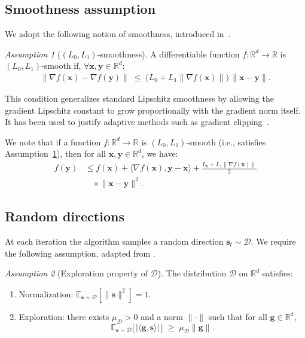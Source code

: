 \documentclass[twoside]{article}
\theoremstyle{plain}
\theoremstyle{definition}
\theoremstyle{remark}
\newtheorem{assumption}{Assumption}
\def\vg{{\bm{g}}}
\def\vs{{\bm{s}}}
\def\vx{{\bm{x}}}
\def\vy{{\bm{y}}}
\newcommand{\E}{\mathbb{E}}
\begin{document}
\subsection{Smoothness assumption}

We adopt the following notion of smoothness, introduced in~\cite{zhang2020gradientclippingacceleratestraining}.

\begin{assumption}[$(L_0,L_1)$-smoothness]
\label{ass:smoothness}
A differentiable function $f:\mathbb{R}^d \to \mathbb{R}$ is $(L_0,L_1)$-smooth if, $\forall \vx,\vy \in \mathbb{R}^d:$
\begin{multline}
    \|\nabla f(\vx) - \nabla f(\vy)\|
    \;\leq\; \big(L_0 + L_1 \|\nabla f(\vx)\|\big)\, \|\vx-\vy\|.
\end{multline}
    

\end{assumption}

This condition generalizes standard Lipschitz smoothness by allowing the gradient 
Lipschitz constant to grow proportionally with the gradient norm itself. It has been 
used to justify adaptive methods such as gradient clipping~\cite{zhang2020gradientclippingacceleratestraining}.

We note that if a function \( f : \mathbb{R}^d \to \mathbb{R} \) is \((L_0, L_1)\)-smooth (i.e., satisfies Assumption~\ref{ass:smoothness}), then for all \(\vx, \vy \in \mathbb{R}^d\), we have:
\begin{equation}\label{ineq:L0,L1}
\begin{aligned}
f(\vy) &\leq f(\vx) + \langle \nabla f(\vx), \vy - \vx \rangle 
+ \frac{L_0 + L_1 \|\nabla f(\vx)\|}{2} \\
&\quad \times \|\vx - \vy\|^2.
\end{aligned}
\end{equation}
\subsection{Random directions}

At each iteration the algorithm samples a random direction $\vs_t \sim \mathcal{D}$. 
We require the following assumption, adapted from 
\cite{bergou2020stochastic, boucherouite2024mistp}.

\begin{assumption}[Exploration property of $\mathcal{D}$]
\label{ass:distribution}
The distribution $\mathcal{D}$ on $\mathbb{R}^d$ satisfies:
\begin{enumerate}
    \item Normalization: $\E_{\vs \sim \mathcal{D}}[\|\vs\|^2] = 1$.
    \item Exploration: there exists $\mu_{\mathcal{D}} > 0$ and a norm $\|\cdot\|$ such that for all $\vg \in \mathbb{R}^d$,
    \begin{equation}
        \E_{\vs \sim \mathcal{D}} \big[\, |\langle \vg, \vs \rangle| \,\big] 
        \;\geq\; \mu_{\mathcal{D}} \|\vg\|.
    \end{equation}
\end{enumerate}
\end{assumption}
\end{document}
